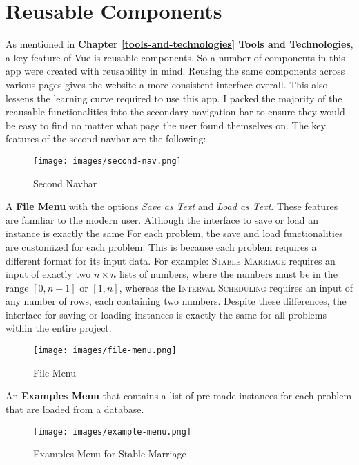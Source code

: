 \section{Reusable Components}
As mentioned in \textbf{Chapter \ref{tools-and-technologies} Tools and Technologies}, 
a key feature of Vue is reusable components. So a number of components in this app 
were created with reusability in mind. 
Reusing the same components across various pages gives the website 
a more consistent interface overall. 
This also lessens the learning curve required to use this app.
I packed the majority of the reausable functionalities into the secondary 
navigation bar to ensure they would be easy to find no matter what page the 
user found themselves on. 
The key features of the second navbar are the following: 
\begin{figure}[h]
	\caption{Second Navbar}
	\texttt{[image: images/second-nav.png]}
	\label{fig-second-nav}
	\centering
\end{figure}
\newline\newline
A \textbf{File Menu} with the options \textit{Save as Text} and \textit{Load as Text}. 
These features are familiar to the modern user. 
Although the interface to save or load an instance is exactly the same For each problem,
the save and load functionalities are customized for each problem. 
This is because each problem requires a different format for its input data.
\newline\newline
For example: \textsc{Stable Marriage} requires an input of exactly two $n\times n$
lists of numbers, where the numbers 
must be in the range $[0, n-1]$ or $[1, n]$, 
whereas the \textsc{Interval Scheduling} 
requires an input of any number of rows, each containing two numbers.
Despite these differences, the interface for saving or loading instances 
is exactly the same for all problems within the entire project. 
\begin{figure}[h]
	\caption{File Menu}
	\texttt{[image: images/file-menu.png]}
	\label{fig-file-menu}
	\centering
\end{figure}
\newline\newline
An \textbf{Examples Menu} that contains a list of 
pre-made instances for each problem that are loaded from a database.
\begin{figure}[h]
	\caption{Examples Menu for Stable Marriage}
	\texttt{[image: images/example-menu.png]}
	\label{fig-example-menu}
	\centering
\end{figure}
